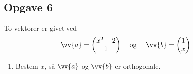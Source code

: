 \subsection*{Opgave 6}


To vektorer er givet ved
\begin{align*}
	&\vv{a} = 
	\begin{pmatrix}
		x^2 - 2 \\
		1	
	\end{pmatrix}& 
	&\textnormal{ og } &
	&\vv{b} = 
	\begin{pmatrix}
		1 \\
		x
	\end{pmatrix}
\end{align*}
\begin{enumerate}[label = \roman*)]
	\item Bestem $x$, så $\vv{a}$ og $\vv{b}$ er orthogonale.
\end{enumerate}
